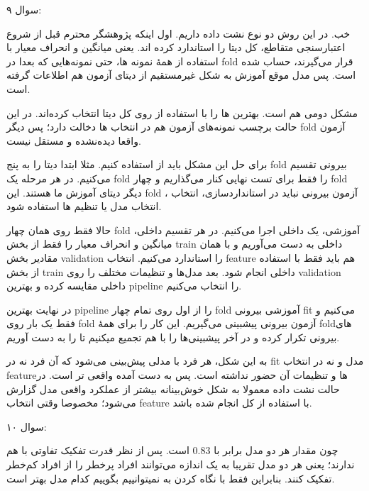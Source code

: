 \documentclass[12pt, answers]{exam}
\renewenvironment{solution}{%
  \par
  \begin{tcolorbox}[
    breakable,                
    colback=white,
    colframe=black,
    arc=1pt,
    boxrule=0.6pt,
    left=4mm, right=4mm,
    top=2mm, bottom=2mm,
    before skip=10pt,
    after skip=10pt,
    segmentation style={solid, black}, 
    before upper={\noindent\textbf{\color{blue}پاسخ:}\par\vspace{0.5em}}
  ]
 }
{%
  \end{tcolorbox}
  \vspace{1em}
}
\begin{document}
\begin{questions}
    \question سوال ۹:
    \begin{solution}
        خب. در این روش دو نوع نشت داده داریم. اول اینکه پژوهشگر محترم قبل از شروع اعتبارسنجی متقاطع، کل دیتا را استاندارد کرده اند. یعنی میانگین و انحراف معیار با استفاده از همهٔ نمونه ها، حتی نمونه‌هایی که بعدا در fold
        قرار می‌گیرند، حساب شده است. پس مدل موقع آموزش به شکل غیرمستقیم از دیتای آزمون هم اطلاعات گرفته است.

        مشکل دومی هم است. بهترین  ها را با استفاده از  روی کل دیتا انتخاب کرده‌اند. در این حالت برچسب نمونه‌های آزمون هم در انتخاب  ها دخالت دارد؛ پس دیگر fold آزمون واقعا دیده‌نشده و مستقل نیست.

        برای حل این مشکل باید از  استفاده کنیم. مثلا ابتدا دیتا را به پنج fold بیرونی تقسیم می‌کنیم. در هر مرحله یک fold را فقط برای تست نهایی کنار می‌گذاریم و چهار fold دیگر دیتای آموزش ما هستند. این fold آزمون بیرونی نباید در استانداردسازی، انتخاب ، انتخاب مدل یا تنظیم ها استفاده شود.

        حالا فقط روی همان چهار fold آموزشی، یک  داخلی اجرا می‌کنیم. در هر تقسیم داخلی، میانگین و انحراف معیار را فقط از بخش train داخلی به دست می‌آوریم و با همان مقادیر بخش validation را استاندارد می‌کنیم. انتخاب feature هم باید فقط با استفاده از  بخش train داخلی انجام شود. بعد مدل‌ها و تنظیمات مختلف را روی validation داخلی مقایسه کرده و بهترین pipeline را انتخاب می‌کنیم.

        در نهایت بهترین pipeline را از اول روی تمام چهار fold آموزشی بیرونی fit می‌کنیم و فقط یک بار روی fold آزمون بیرونی پیشبینی می‌گیریم. این کار را برای همهٔ foldهای بیرونی تکرار کرده و در آخر پیشبینی‌ها را با هم تجمیع میکنیم تا  را به دست آوریم.

        به این شکل، هر فرد با مدلی پیش‌بینی می‌شود که آن فرد نه در fit مدل و نه در انتخاب featureها و تنظیمات آن حضور نداشته است. پس  به دست آمده واقعی تر است. در حالت نشت داده معمولا  به شکل خوش‌بینانه بیشتر از عملکرد واقعی مدل گزارش می‌شود؛ مخصوصا وقتی انتخاب feature با استفاده از کل  انجام شده باشد.
    \end{solution}

    \question سوال ۱۰:
    \begin{solution}
        چون مقدار  هر دو مدل برابر با $0.83$ است. پس از نظر قدرت تفکیک تفاوتی با هم ندارند؛ یعنی هر دو مدل تقریبا به یک اندازه می‌توانند افراد پرخطر را از افراد کم‌خطر تفکیک کنند.
        بنابراین فقط با نگاه کردن به  نمیتوانییم بگوییم کدام مدل بهتر است.


\end{solution}
\end{questions}
\end{document}
